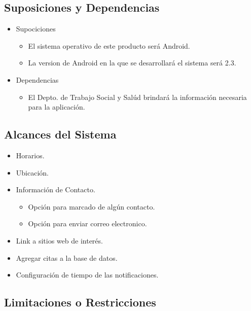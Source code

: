 \documentclass[12pt]{article}
\begin{document}
\subsection{Suposiciones y Dependencias}

\begin{itemize}

\item{Supociciones}
\begin{itemize}
	\item{El sistema operativo de este producto ser\'a Android.}
	\item{La version de Android en la que se desarrollar\'a el sistema ser\'a 2.3.}
\end{itemize}

\item{Dependencias}
\begin{itemize}
	\item{El Depto. de Trabajo Social y Sal\'ud brindar\'a la informaci\'on necesaria para la aplicaci\'on.}
\end{itemize}

\end{itemize}

\subsection{Alcances del Sistema}

\begin{itemize}
	\item{Horarios.}
	\item{Ubicaci\'on.}
	\item{Informaci\'on de Contacto.}
	\begin{itemize}
		\item{Opci\'on para marcado de alg\'un contacto.}
		\item{Opci\'on para enviar correo electronico.}
	\end{itemize}
	\item{Link a sitios web de inter\'es.}
	\item{Agregar citas a la base de datos.}
	\item{Configuraci\'on de tiempo de las notificaciones.}
\end{itemize}

\subsection{Limitaciones o Restricciones}
\end{document}
